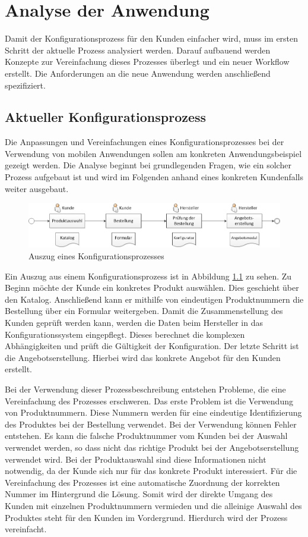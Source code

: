 \chapter{Analyse der Anwendung}\label{chapter_3}
Damit der Konfigurationsprozess für den Kunden einfacher wird, muss im ersten Schritt der aktuelle Prozess analysiert werden. Darauf aufbauend werden Konzepte zur Vereinfachung dieses Prozesses überlegt und ein neuer Workflow erstellt. Die Anforderungen an die neue Anwendung werden anschließend spezifiziert.

\section{Aktueller Konfigurationsprozess}
Die Anpassungen und Vereinfachungen eines Konfigurationsprozesses bei der Verwendung von mobilen Anwendungen sollen am konkreten Anwendungsbeispiel gezeigt werden. Die Analyse beginnt bei grundlegenden Fragen, wie ein solcher Prozess aufgebaut ist und wird im Folgenden anhand eines konkreten Kundenfalls weiter ausgebaut.

\begin{figure}
\label{oldWorkflow}
\centering
\includegraphics[width=\hsize]{images/konfigurationsprozess_alt}
\caption{Auszug eines Konfigurationsprozesses}
\end{figure}
Ein Auszug aus einem Konfigurationsprozess ist in Abbildung  \ref{oldWorkflow} zu sehen. Zu Beginn möchte der Kunde ein konkretes Produkt auswählen. Dies geschieht über den Katalog.  Anschließend kann er mithilfe von eindeutigen Produktnummern die Bestellung über ein Formular weitergeben. Damit die Zusammenstellung des Kunden geprüft werden kann, werden die Daten beim Hersteller in das Konfigurationssystem eingepflegt. Dieses berechnet die komplexen Abhängigkeiten und prüft die Gültigkeit der Konfiguration. Der letzte Schritt ist die Angebotserstellung. Hierbei wird das konkrete Angebot für den Kunden erstellt.
\par

Bei der Verwendung dieser Prozessbeschreibung entstehen Probleme, die eine Vereinfachung des Prozesses erschweren. Das erste Problem ist die Verwendung von Produktnummern. Diese Nummern werden für eine eindeutige Identifizierung des Produktes bei der Bestellung verwendet. Bei der Verwendung können Fehler entstehen. Es kann die falsche Produktnummer vom Kunden bei der Auswahl verwendet werden, so dass nicht das richtige Produkt bei der Angebotserstellung verwendet wird. Bei der Produktauswahl sind 
diese Informationen nicht notwendig, da der Kunde sich nur für das konkrete Produkt interessiert. Für die Vereinfachung des Prozesses ist eine automatische Zuordnung der korrekten Nummer im Hintergrund die Lösung. Somit wird der direkte Umgang des Kunden mit einzelnen Produktnummern vermieden und die alleinige Auswahl des Produktes steht für den Kunden im Vordergrund. Hierdurch wird der Prozess vereinfacht. \par

